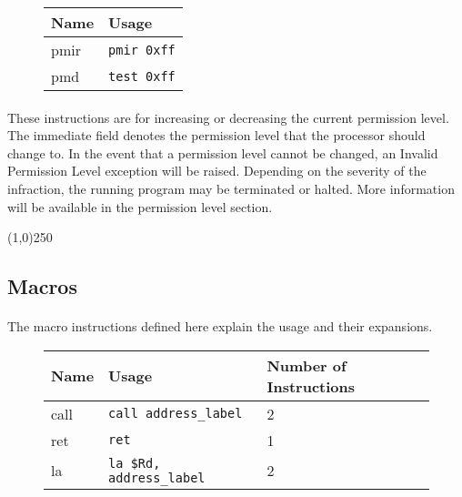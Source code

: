 \documentclass[letterpaper, 11pt]{article}
\begin{document}
\begin{figure}[!h]
	\begin{center}
		\begin{tabular}{|l|l|}
			\hline
			Name		& Usage \\ \hline
			pmir	& \texttt{pmir	0xff}	\\ \hline
			pmd		& \texttt{test	0xff}	\\ \hline
		 		\end{tabular} 
	\end{center}
	
\end{figure}
\paragraph{} These instructions are for increasing or decreasing the current permission level. The immediate field
denotes the permission level that the processor should change to. In the event that a permission level cannot be changed,
an Invalid Permission Level exception will be raised. Depending on the severity of the infraction, the running program
may be terminated or halted. More information will be available in the permission level section.

\begin{center}
	\line(1,0){250}
\end{center}


\subsection{Macros}
\paragraph{} The macro instructions defined here explain the usage and their expansions.

\begin{figure}[!h]
	\begin{center}
		\begin{tabular}{|l|l|l|}
			\hline
			Name		& Usage & Number of Instructions\\ \hline
			call	& \texttt{call	address\_label}		&	2	\\ \hline
			ret		& \texttt{ret	}					&	1	\\ \hline
			la		& \texttt{la \$Rd, address\_label}	& 	2	\\ \hline
		 		\end{tabular} 
	\end{center}
	
\end{figure}
\end{document}
